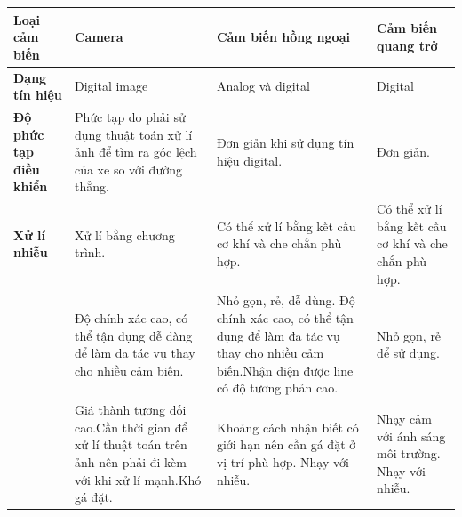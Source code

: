     \begin{table}[H]
        \centering
        \begin{tabular}{|>{\raggedright\arraybackslash}p{2.5cm}|>{\raggedright\arraybackslash}p{3cm}|>{\raggedright\arraybackslash}p{4cm}|>{\raggedright\arraybackslash}p{3cm}|}
        \hline
        \textbf{Loại cảm biến} & \textbf{Camera} & \textbf{Cảm biến hồng ngoại} & \textbf{Cảm biến quang trở} \\
        \hline
        \textbf{Dạng tín hiệu} & Digital image & Analog và digital & Digital \\
        \hline
        \textbf{Độ phức tạp điều khiển} & Phức tạp do phải sử dụng thuật toán xử lí ảnh để tìm ra góc lệch của xe so với đường thẳng. & Đơn giản khi sử dụng tín hiệu digital. & Đơn giản. \\
        \hline
        \textbf{Xử lí nhiễu} & Xử lí bằng chương trình. & Có thể xử lí bằng kết cấu cơ khí và che chắn phù hợp. & Có thể xử lí bằng kết cấu cơ khí và che chắn phù hợp. \\
        \hline
        \multirow{3}{*}{\textbf{Ưu điểm}} & Độ chính xác cao, có thể tận dụng dễ dàng để làm đa tác vụ thay cho nhiều cảm biến. & Nhỏ gọn, rẻ, dễ dùng. Độ chính xác cao, có thể tận dụng để làm đa tác vụ thay cho nhiều cảm biến.\newline Nhận diện được line có độ tương phản cao. & Nhỏ gọn, rẻ để sử dụng. \\
        \hline
        \multirow{3}{*}{\textbf{Nhược điểm}} & Giá thành tương đối cao.\newline Cần thời gian để xử lí thuật toán trên ảnh nên phải đi kèm với khi xử lí mạnh.\newline Khó gá đặt. & Khoảng cách nhận biết có giới hạn nên cần gá đặt ở vị trí phù hợp. \newline Nhạy với nhiễu. & Nhạy cảm với ánh sáng môi trường. \newline Nhạy với nhiễu. \\
        \hline
        \end{tabular}
    \end{table}


